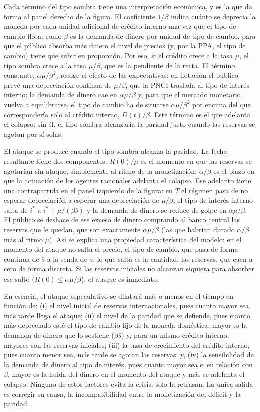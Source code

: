 \documentclass[10pt,a4paper]{article}
\begin{document}
Cada término del tipo sombra tiene una interpretación económica, y es la que da forma al panel derecho de la figura. El coeficiente $1/\beta$ indica cuánto se deprecia la moneda por cada unidad adicional de crédito interno una vez que el tipo de cambio flota: como $\beta$ es la demanda de dinero por unidad de tipo de cambio, para que el público absorba más dinero el nivel de precios (y, por la PPA, el tipo de cambio) tiene que subir en proporción. Por eso, si el crédito crece a la tasa $\mu$, el tipo sombra crece a la tasa $\mu/\beta$, que es la pendiente de la recta. El término constante, $\alpha\mu/\beta^2$, recoge el efecto de las expectativas: en flotación el público prevé una depreciación continua de $\mu/\beta$, que la PNCI traslada al tipo de interés interno; la demanda de dinero cae en $\alpha\mu/\beta$ y, para que el mercado monetario vuelva a equilibrarse, el tipo de cambio ha de situarse $\alpha\mu/\beta^2$ por encima del que correspondería solo al crédito interno, $D(t)/\beta$. Este término es el que adelanta el colapso: sin él, el tipo sombra alcanzaría la paridad justo cuando las reservas se agotan por sí solas.

El ataque se produce cuando el tipo sombra alcanza la paridad. La fecha resultante tiene dos componentes. $R(0)/\mu$ es el momento en que las reservas se agotarían sin ataque, simplemente al ritmo de la monetización; $\alpha/\beta$ es el plazo en que la actuación de los agentes racionales adelanta el colapso. Ese adelanto tiene una contrapartida en el panel izquierdo de la figura: en $T$ el régimen pasa de no esperar depreciación a esperar una depreciación de $\mu/\beta$, el tipo de interés interno salta de $i^*$ a $i^*+\mu/(\beta\bar s)$ y la demanda de dinero se reduce de golpe en $\alpha\mu/\beta$. El público se deshace de ese exceso de dinero comprando al banco central las reservas que le quedan, que son exactamente $\alpha\mu/\beta$ (las que habrían durado $\alpha/\beta$ más al ritmo $\mu$). Así se explica una propiedad característica del modelo: en el momento del ataque no salta el precio, el tipo de cambio, que pasa de forma continua de $\bar s$ a la senda de $\tilde s$; lo que salta es la cantidad, las reservas, que caen a cero de forma discreta. Si las reservas iniciales no alcanzan siquiera para absorber ese salto ($R(0)\leq\alpha\mu/\beta$), el ataque es inmediato.

En esencia, el ataque especulativo se dilatará más o menos en el tiempo en función de: (i) el nivel inicial de reservas internacionales, pues cuanto mayor sea, más tarde llega el ataque; (ii) el nivel de la paridad que se defiende, pues cuanto más depreciado esté el tipo de cambio fijo de la moneda doméstica, mayor es la demanda de dinero que lo sostiene ($\beta\bar s$) y, para un mismo crédito interno, mayores son las reservas iniciales; (iii) la tasa de crecimiento del crédito interno, pues cuanto menor sea, más tarde se agotan las reservas; y, (iv) la sensibilidad de la demanda de dinero al tipo de interés, pues cuanto mayor sea $\alpha$ en relación con $\beta$, mayor es la huida del dinero en el momento del ataque y más se adelanta el colapso. Ninguno de estos factores evita la crisis: solo la retrasan. La única salida es corregir su causa, la incompatibilidad entre la monetización del déficit y la paridad.
\end{document}
